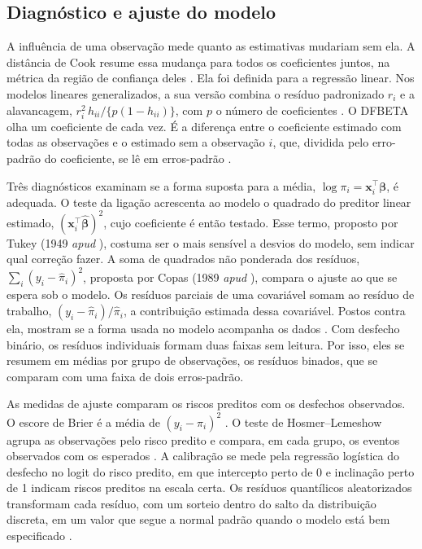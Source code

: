 \documentclass[12pt,a4paper]{article}
\begin{document}
\subsection{Diagnóstico e ajuste do modelo}
\label{sec:fund-diagnostico}

A influência de uma observação mede quanto as estimativas mudariam sem ela. A distância de Cook resume essa mudança para todos os coeficientes juntos, na métrica da região de confiança deles \citep[p.~16]{cook1977detection}. Ela foi definida para a regressão linear. Nos modelos lineares generalizados, a sua versão combina o resíduo padronizado $r_i$ e a alavancagem, $r_i^2\,h_{ii}/\{p(1-h_{ii})\}$, com $p$ o número de coeficientes \citep[p.~138]{agresti2015foundations}. O DFBETA olha um coeficiente de cada vez. É a diferença entre o coeficiente estimado com todas as observações e o estimado sem a observação $i$, que, dividida pelo erro-padrão do coeficiente, se lê em erros-padrão \citep[pp.~402--403]{fox2019companion}.

Três diagnósticos examinam se a forma suposta para a média, $\log \pi_i = \mathbf{x}_i^\top\boldsymbol{\beta}$, é adequada. O teste da ligação acrescenta ao modelo o quadrado do preditor linear estimado, $(\mathbf{x}_i^\top\hat{\boldsymbol{\beta}})^2$, cujo coeficiente é então testado. Esse termo, proposto por Tukey (1949 \textit{apud} \citealp[p.~23]{pregibon1980goodness}), costuma ser o mais sensível a desvios do modelo, sem indicar qual correção fazer. A soma de quadrados não ponderada dos resíduos, $\sum_i (y_i - \hat\pi_i)^2$, proposta por Copas (1989 \textit{apud} \citealp{hosmer1997comparison}), compara o ajuste ao que se espera sob o modelo. Os resíduos parciais de uma covariável somam ao resíduo de trabalho, $(y_i - \hat\pi_i)/\hat\pi_i$, a contribuição estimada dessa covariável. Postos contra ela, mostram se a forma usada no modelo acompanha os dados \citep[pp.~410--412]{fox2019companion}. Com desfecho binário, os resíduos individuais formam duas faixas sem leitura. Por isso, eles se resumem em médias por grupo de observações, os resíduos binados, que se comparam com uma faixa de dois erros-padrão.

As medidas de ajuste comparam os riscos preditos com os desfechos observados. O escore de Brier é a média de $(y_i - \hat\pi_i)^2$ \citep[p.~368]{harrell1996multivariable}. O teste de Hosmer--Lemeshow agrupa as observações pelo risco predito e compara, em cada grupo, os eventos observados com os esperados \citep{hosmer1997comparison}. A calibração se mede pela regressão logística do desfecho no logit do risco predito, em que intercepto perto de 0 e inclinação perto de 1 indicam riscos preditos na escala certa. Os resíduos quantílicos aleatorizados transformam cada resíduo, com um sorteio dentro do salto da distribuição discreta, em um valor que segue a normal padrão quando o modelo está bem especificado \citep[pp.~238--239]{dunn1996randomized}.
\end{document}
